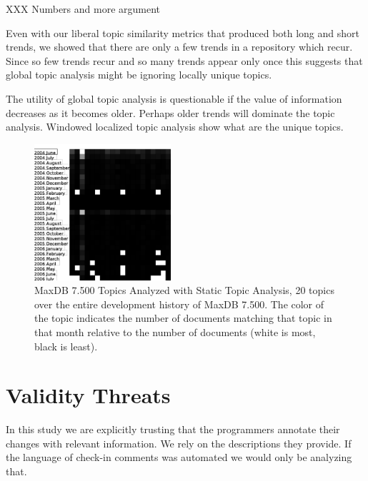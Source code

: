 \documentclass[times, 10pt,twocolumn]{article}
\begin{document}
XXX Numbers and more argument

Even with our liberal topic similarity metrics that produced both
long and short trends, we showed that there are only a few trends in a
repository which recur. Since so few trends recur and so many
trends appear only once this suggests that global topic analysis might
be ignoring locally unique topics. 

The utility of global topic analysis is questionable if the value of
information decreases as it becomes older. Perhaps older trends will
dominate the topic analysis. Windowed localized topic analysis show
what are the unique topics.




\begin{figure}
  \centering
  \includegraphics[width=0.45\textwidth]{maxdb7500-everything-by-month}
  \caption{MaxDB 7.500 Topics Analyzed with Static Topic Analysis, 20
    topics over the entire development history of MaxDB 7.500. The
    color of the topic indicates the number of documents matching that
    topic in that month relative to the number of documents (white is
    most, black is least).}
  \label{fig:statictopics}
\end{figure}




\section{Validity Threats}

In this study we are explicitly trusting that the programmers annotate
their changes with relevant information. We rely on the descriptions
they provide. If the language of check-in comments was automated we
would only be analyzing that.
\end{document}

